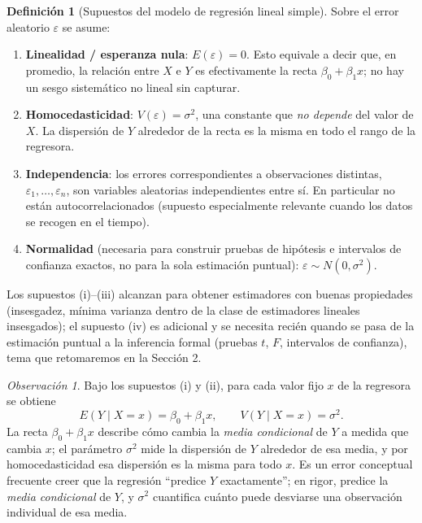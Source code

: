 \documentclass[11pt,a4paper]{article}
\theoremstyle{plain}
\theoremstyle{definition}
\newtheorem{definicion}[teorema]{Definición}
\theoremstyle{remark}
\newtheorem{observacion}[teorema]{Observación}
\begin{document}
\begin{definicion}[Supuestos del modelo de regresión lineal simple]
Sobre el error aleatorio $\varepsilon$ se asume:
\begin{enumerate}[label=(\roman*)]
\item \textbf{Linealidad / esperanza nula}: $E(\varepsilon)=0$. Esto equivale a decir que, en promedio, la relación entre $X$ e $Y$ es efectivamente la recta $\beta_0+\beta_1 x$; no hay un sesgo sistemático no lineal sin capturar.
\item \textbf{Homocedasticidad}: $V(\varepsilon)=\sigma^2$, una constante que \emph{no depende} del valor de $X$. La dispersión de $Y$ alrededor de la recta es la misma en todo el rango de la regresora.
\item \textbf{Independencia}: los errores correspondientes a observaciones distintas, $\varepsilon_1,\dots,\varepsilon_n$, son variables aleatorias independientes entre sí. En particular no están autocorrelacionados (supuesto especialmente relevante cuando los datos se recogen en el tiempo).
\item \textbf{Normalidad} (necesaria para construir pruebas de hipótesis e intervalos de confianza exactos, no para la sola estimación puntual): $\varepsilon \sim N(0,\sigma^2)$.
\end{enumerate}
\end{definicion}

Los supuestos (i)--(iii) alcanzan para obtener estimadores con buenas propiedades (insesgadez, mínima varianza dentro de la clase de estimadores lineales insesgados); el supuesto (iv) es adicional y se necesita recién quando se pasa de la estimación puntual a la inferencia formal (pruebas $t$, $F$, intervalos de confianza), tema que retomaremos en la Sección 2.

\begin{observacion}
Bajo los supuestos (i) y (ii), para cada valor fijo $x$ de la regresora se obtiene
\[
E(Y\mid X=x) = \beta_0+\beta_1 x, \qquad V(Y\mid X=x)=\sigma^2.
\]
La recta $\beta_0+\beta_1 x$ describe cómo cambia la \emph{media condicional} de $Y$ a medida que cambia $x$; el parámetro $\sigma^2$ mide la dispersión de $Y$ alrededor de esa media, y por homocedasticidad esa dispersión es la misma para todo $x$. Es un error conceptual frecuente creer que la regresión ``predice $Y$ exactamente''; en rigor, predice la \emph{media condicional} de $Y$, y $\sigma^2$ cuantifica cuánto puede desviarse una observación individual de esa media.
\end{observacion}
\end{document}
